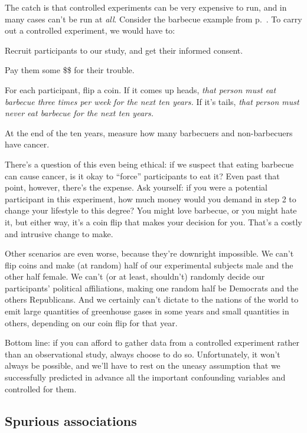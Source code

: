 The catch is that controlled experiments can be very expensive to run, and in
many cases can't be run at \textit{all}. Consider the barbecue example from
p.~\pageref{barbecue}. To carry out a controlled experiment, we would have to:

\begin{compactenum}
\item Recruit participants to our study, and get their informed consent.
\item Pay them some \$\$ for their trouble.
\item For each participant, flip a coin. If it comes up heads, \textit{that
person must eat barbecue three times per week for the next ten years.} If it's
tails, \textit{that person must never eat barbecue for the next ten years.}
\item At the end of the ten years, measure how many barbecuers and
non-barbecuers have cancer.
\end{compactenum}

There's a question of this even being ethical: if we suspect that eating
barbecue can cause cancer, is it okay to ``force'' participants to eat it? Even
past that point, however, there's the expense. Ask yourself: if you were a
potential participant in this experiment, how much money would you demand in
step 2 to change your lifestyle to this degree? You might love barbecue, or you
might hate it, but either way, it's a coin flip that makes your decision for
you. That's a costly and intrusive change to make.

Other scenarios are even worse, because they're downright impossible. We can't
flip coins and make (at random) half of our experimental subjects male
and the other half female. We can't (or at least, shouldn't) randomly decide
our participants' political affiliations, making one random half be Democrats
and the others Republicans. And we certainly can't dictate to the nations of
the world to emit large quantities of greenhouse gases in some years and small
quantities in others, depending on our coin flip for that year.

Bottom line: if you can afford to gather data from a controlled experiment
rather than an observational study, always choose to do so. Unfortunately, it
won't always be possible, and we'll have to rest on the uneasy assumption that
we successfully predicted in advance all the important confounding variables
and controlled for them.


\subsection{Spurious associations}

